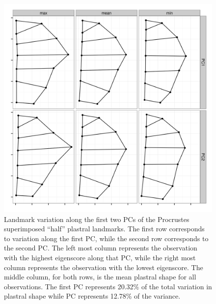 \documentclass[12pt,letterpaper]{article}\usepackage{graphicx, color}
\begin{document}
\begin{figure}[ht]
  \centering
  \includegraphics[width = \textwidth]{figure/pc_var}
  \caption{Landmark variation along the first two PCs of the Procrustes superimposed ``half'' plastral landmarks. The first row corresponds to variation along the first PC, while the second row corresponds to the second PC. The left most column represents the observation with the highest eigenscore along that PC, while the right most column represents the observation with the lowest eigenscore. The middle column, for both rows, is the mean plastral shape for all observations. The first PC represents 20.32\% of the total variation in plastral shape while PC represents 12.78\% of the variance.}
  \label{fig:pc_var}
\end{figure}
\end{document}
